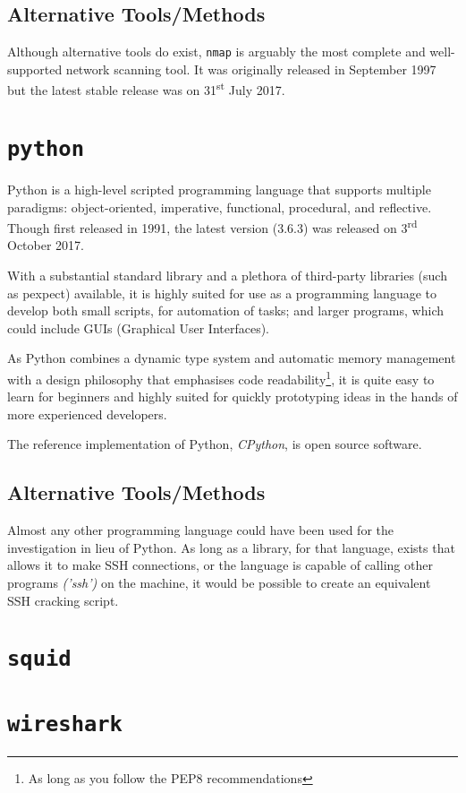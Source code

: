 \documentclass[12pt]{report}
\begin{document}
\subsection*{Alternative Tools/Methods}
Although alternative tools do exist, \texttt{nmap} is arguably the most complete and well-supported network scanning tool. It was originally released in September 1997 but the latest stable release was on 31\textsuperscript{st} July 2017.

\section{\texttt{python}}
Python is a high-level scripted programming language that supports multiple paradigms: object-oriented, imperative, functional, procedural, and reflective. Though first released in 1991, the latest version (3.6.3) was released on 3\textsuperscript{rd} October 2017.

With a substantial standard library and a plethora of third-party libraries (such as pexpect) available, it is highly suited for use as a programming language to develop both small scripts, for automation of tasks; and larger programs, which could include GUIs (Graphical User Interfaces).

As Python combines a dynamic type system and automatic memory management with a design philosophy that emphasises code readability\footnote{As long as you follow the PEP8 recommendations}, it is quite easy to learn for beginners and highly suited for quickly prototyping ideas in the hands of more experienced developers.

The reference implementation of Python, \textit{CPython}, is open source software.
\subsection*{Alternative Tools/Methods}
Almost any other programming language could have been used for the investigation in lieu of Python. As long as a library, for that language, exists that allows it to make SSH connections, or the language is capable of calling other programs \textit{('ssh')} on the machine, it would be possible to create an equivalent SSH cracking script.

\section{\texttt{squid}}
\section{\texttt{wireshark}}
\end{document}
